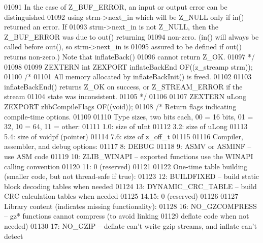 \begin{DoxyCode}
01091 \textcolor{comment}{   In the case of Z\_BUF\_ERROR, an input or output error can be distinguished}
01092 \textcolor{comment}{   using strm->next\_in which will be Z\_NULL only if in() returned an error.  If}
01093 \textcolor{comment}{   strm->next\_in is not Z\_NULL, then the Z\_BUF\_ERROR was due to out() returning}
01094 \textcolor{comment}{   non-zero.  (in() will always be called before out(), so strm->next\_in is}
01095 \textcolor{comment}{   assured to be defined if out() returns non-zero.) Note that inflateBack()}
01096 \textcolor{comment}{   cannot return Z\_OK.}
01097 \textcolor{comment}{*/}
01098 
01099 ZEXTERN \textcolor{keywordtype}{int} ZEXPORT inflateBackEnd OF((z\_streamp strm));
01100 \textcolor{comment}{/*}
01101 \textcolor{comment}{     All memory allocated by inflateBackInit() is freed.}
01102 \textcolor{comment}{}
01103 \textcolor{comment}{     inflateBackEnd() returns Z\_OK on success, or Z\_STREAM\_ERROR if the stream}
01104 \textcolor{comment}{   state was inconsistent.}
01105 \textcolor{comment}{*/}
01106 
01107 ZEXTERN uLong ZEXPORT zlibCompileFlags OF((\textcolor{keywordtype}{void}));
01108 \textcolor{comment}{/* Return flags indicating compile-time options.}
01109 \textcolor{comment}{}
01110 \textcolor{comment}{    Type sizes, two bits each, 00 = 16 bits, 01 = 32, 10 = 64, 11 = other:}
01111 \textcolor{comment}{     1.0: size of uInt}
01112 \textcolor{comment}{     3.2: size of uLong}
01113 \textcolor{comment}{     5.4: size of voidpf (pointer)}
01114 \textcolor{comment}{     7.6: size of z\_off\_t}
01115 \textcolor{comment}{}
01116 \textcolor{comment}{    Compiler, assembler, and debug options:}
01117 \textcolor{comment}{     8: DEBUG}
01118 \textcolor{comment}{     9: ASMV or ASMINF -- use ASM code}
01119 \textcolor{comment}{     10: ZLIB\_WINAPI -- exported functions use the WINAPI calling convention}
01120 \textcolor{comment}{     11: 0 (reserved)}
01121 \textcolor{comment}{}
01122 \textcolor{comment}{    One-time table building (smaller code, but not thread-safe if true):}
01123 \textcolor{comment}{     12: BUILDFIXED -- build static block decoding tables when needed}
01124 \textcolor{comment}{     13: DYNAMIC\_CRC\_TABLE -- build CRC calculation tables when needed}
01125 \textcolor{comment}{     14,15: 0 (reserved)}
01126 \textcolor{comment}{}
01127 \textcolor{comment}{    Library content (indicates missing functionality):}
01128 \textcolor{comment}{     16: NO\_GZCOMPRESS -- gz* functions cannot compress (to avoid linking}
01129 \textcolor{comment}{                          deflate code when not needed)}
01130 \textcolor{comment}{     17: NO\_GZIP -- deflate can't write gzip streams, and inflate can't detect}

\end{DoxyCode}
